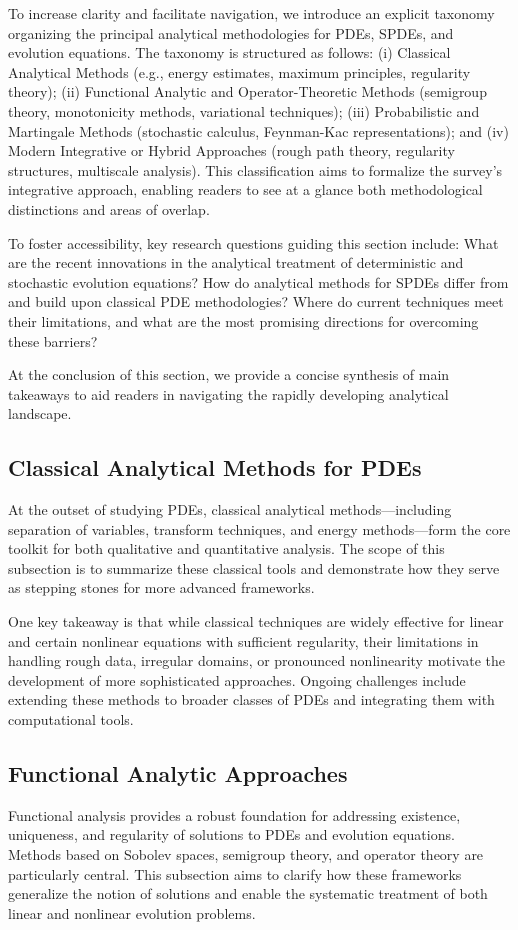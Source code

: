 \documentclass[sigconf]{acmart}
\begin{document}
To increase clarity and facilitate navigation, we introduce an explicit taxonomy organizing the principal analytical methodologies for PDEs, SPDEs, and evolution equations. The taxonomy is structured as follows: (i) Classical Analytical Methods (e.g., energy estimates, maximum principles, regularity theory); (ii) Functional Analytic and Operator-Theoretic Methods (semigroup theory, monotonicity methods, variational techniques); (iii) Probabilistic and Martingale Methods (stochastic calculus, Feynman-Kac representations); and (iv) Modern Integrative or Hybrid Approaches (rough path theory, regularity structures, multiscale analysis). This classification aims to formalize the survey’s integrative approach, enabling readers to see at a glance both methodological distinctions and areas of overlap.

To foster accessibility, key research questions guiding this section include: What are the recent innovations in the analytical treatment of deterministic and stochastic evolution equations? How do analytical methods for SPDEs differ from and build upon classical PDE methodologies? Where do current techniques meet their limitations, and what are the most promising directions for overcoming these barriers?

At the conclusion of this section, we provide a concise synthesis of main takeaways to aid readers in navigating the rapidly developing analytical landscape.

\subsection{Classical Analytical Methods for PDEs}
At the outset of studying PDEs, classical analytical methods—including separation of variables, transform techniques, and energy methods—form the core toolkit for both qualitative and quantitative analysis. The scope of this subsection is to summarize these classical tools and demonstrate how they serve as stepping stones for more advanced frameworks.

One key takeaway is that while classical techniques are widely effective for linear and certain nonlinear equations with sufficient regularity, their limitations in handling rough data, irregular domains, or pronounced nonlinearity motivate the development of more sophisticated approaches. Ongoing challenges include extending these methods to broader classes of PDEs and integrating them with computational tools.

\subsection{Functional Analytic Approaches}
Functional analysis provides a robust foundation for addressing existence, uniqueness, and regularity of solutions to PDEs and evolution equations. Methods based on Sobolev spaces, semigroup theory, and operator theory are particularly central. This subsection aims to clarify how these frameworks generalize the notion of solutions and enable the systematic treatment of both linear and nonlinear evolution problems.
\end{document}

